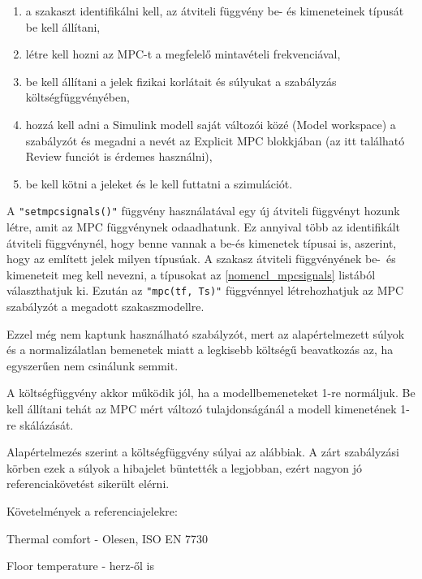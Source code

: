 \begin{enumerate}[noitemsep,topsep=0pt,parsep=2pt,partopsep=4pt,leftmargin=30pt]
	\item a szakaszt identifikálni kell, az átviteli függvény be- és kimeneteinek típusát be kell állítani,
	\item létre kell hozni az MPC-t a megfelelő mintavételi frekvenciával,
	\item be kell állítani a jelek fizikai korlátait és súlyukat a szabályzás költségfüggvényében,
	\item hozzá kell adni a Simulink modell saját változói közé (Model workspace) a szabályzót és megadni a nevét az Explicit MPC blokkjában (az itt található Review funciót is érdemes használni),
	\item be kell kötni a jeleket és le kell futtatni a szimulációt.
	
\end{enumerate}


A \verb|"setmpcsignals()"| függvény használatával egy új átviteli függvényt hozunk létre, amit az MPC függvénynek odaadhatunk. Ez annyival több az identifikált átviteli függvénynél, hogy benne vannak a be-és kimenetek típusai is, aszerint, hogy az említett jelek milyen típusúak. A szakasz átviteli függvényének be-~és kimeneteit meg kell nevezni, a típusokat az \ref{nomencl_mpcsignals} listából választhatjuk ki. Ezután az \verb|"mpc(tf, Ts)"| függvénnyel létrehozhatjuk az MPC szabályzót a megadott szakaszmodellre.

Ezzel még nem kaptunk használható szabályzót, mert az alapértelmezett súlyok és a normalizálatlan bemenetek miatt a legkisebb költségű beavatkozás az, ha egyszerűen nem csinálunk semmit.

A költségfüggvény akkor működik jól, ha a modellbemeneteket 1-re normáljuk. Be kell állítani tehát az MPC mért változó tulajdonságánál a modell kimenetének 1-re skálázását. 

Alapértelmezés szerint a költségfüggvény súlyai az alábbiak. A zárt szabályzási körben ezek a súlyok a hibajelet büntették a legjobban, ezért nagyon jó referenciakövetést sikerült elérni.


Követelmények a referenciajelekre:

Thermal comfort - Olesen, ISO EN 7730

Floor temperature - herz-ől is



